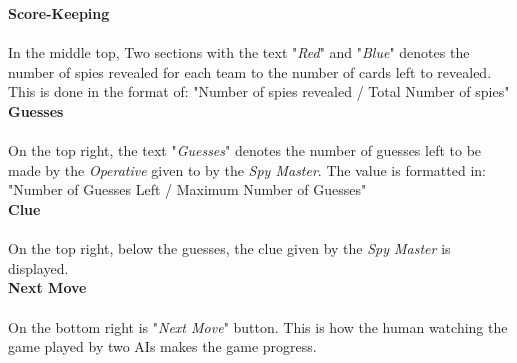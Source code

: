 \documentclass[10pt, a4paper]{article}
\begin{document}
	   \textbf{Score-Keeping}\\
	   \\
	   In the middle top, Two sections with the text "\textit{Red}" and "\textit{Blue}" denotes the number of spies revealed for each team to the number of cards left to revealed. This is done in the format of: "Number of spies revealed / Total Number of spies"\\
	   
	   \textbf{Guesses}\\
	   \\
	    On the top right, the text "\textit{Guesses}" denotes the number of guesses left to be made by the \textit{Operative} given to by the \textit{Spy Master}. The value is formatted in: "Number of Guesses Left / Maximum Number of Guesses"\\
	   
	   \textbf{Clue}\\
	   \\
	   On the top right, below the guesses, the clue given by the \textit{Spy Master} is displayed.\\
	   
	   
	   \textbf{Next Move}\\
	   \\
	   On the bottom right is "\textit{Next Move}" button. This is how the human watching the game played by two AIs makes the game progress.\\
	   
	 
	
\end{document}
